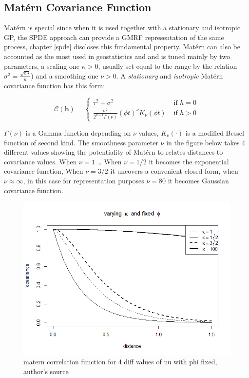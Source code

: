 \documentclass[
  12pt,
  a4paper,
  oneside]{book}
\theoremstyle{definition}
\theoremstyle{definition}
\theoremstyle{definition}
\theoremstyle{remark}
\begin{document}
\hypertarget{Matern}{%
\subsection{Matérn Covariance Function}\label{Matern}}

Matérn is special since when it is used together with a stationary and isotropic GP, the SPDE approach can provide a GMRF representation of the same process, chapter \ref{spde} discloses this fundamental property.
Matérn can also be accounted as the most used in geostatistics \citep{Krainski2018} and \citep{Bayesian_INLA_Rubio} and is tuned mainly by two parameters, a scaling one \(\kappa>0\), usually set equal to the range by the relation \(\sigma^{2}=\frac{\sqrt{8 \lambda}}{\kappa}\)) and a smoothing one \(\nu>0\). A \emph{stationary} and \emph{isotropic} Matérn covariance function has this form:

\[
\mathcal{C}(\mathbf{h})=\left\{\begin{array}{ll}
\tau^{2}+\sigma^{2} & \text { if } h=0 \\
\frac{\sigma^{2}}{2^{\nu-1} \Gamma(\nu)}(\phi t)^{\nu} K_{\nu}(\phi t) & \text { if } h>0
\end{array}\right.
\]

\(\Gamma(\nu)\) is a Gamma function depending on \(\nu\) values, \(K_{\nu}(\cdot)\) is a modified Bessel function of second kind. The smoothness parameter \(\nu\) in the figure below takes 4 different values showing the potentiality of Matérn to relates distances to covariance values. When \(\nu = 1\) \ldots{} When \(\nu = 1/2\) it becomes the exponential covariance function, When \(\nu = 3/2\) it uncovers a convenient closed form, when \(\nu \approx \infty\), in this case for representation purposes \(\nu = 80\) it becomes Gaussian covariance function.

\begin{figure}
\centering
\includegraphics{images/matern.png}
\caption{matern correlation function for 4 diff values of nu with phi fixed, author's source}
\end{figure}
\end{document}

